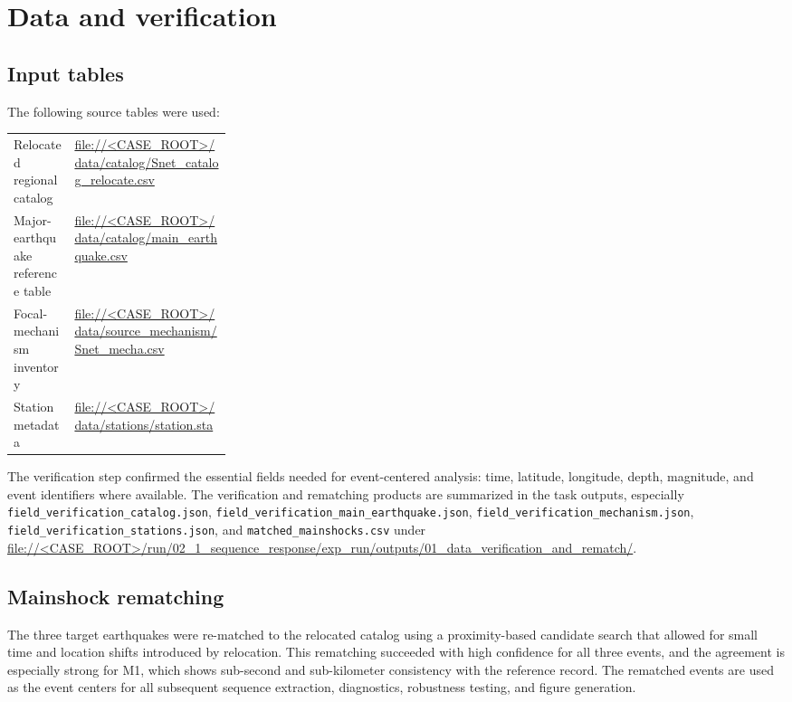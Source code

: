 \documentclass[11pt]{article}
\begin{document}
\section{Data and verification}
\subsection{Input tables}
The following source tables were used:\newline
\begin{tabularx}{\linewidth}{@{}>{\raggedright\arraybackslash}p{0.28\linewidth}X@{}}
Relocated regional catalog & \url{file://<CASE_ROOT>/data/catalog/Snet_catalog_relocate.csv} \\
Major-earthquake reference table & \url{file://<CASE_ROOT>/data/catalog/main_earthquake.csv} \\
Focal-mechanism inventory & \url{file://<CASE_ROOT>/data/source_mechanism/Snet_mecha.csv} \\
Station metadata & \url{file://<CASE_ROOT>/data/stations/station.sta} \\
\end{tabularx}

The verification step confirmed the essential fields needed for event-centered analysis: time, latitude, longitude, depth, magnitude, and event identifiers where available. The verification and rematching products are summarized in the task outputs, especially \texttt{field\_verification\_catalog.json}, \texttt{field\_verification\_main\_earthquake.json}, \texttt{field\_verification\_mechanism.json}, \texttt{field\_verification\_stations.json}, and \texttt{matched\_mainshocks.csv} under \url{file://<CASE_ROOT>/run/02_1_sequence_response/exp_run/outputs/01_data_verification_and_rematch/}.

\subsection{Mainshock rematching}
The three target earthquakes were re-matched to the relocated catalog using a proximity-based candidate search that allowed for small time and location shifts introduced by relocation. This rematching succeeded with high confidence for all three events, and the agreement is especially strong for M1, which shows sub-second and sub-kilometer consistency with the reference record. The rematched events are used as the event centers for all subsequent sequence extraction, diagnostics, robustness testing, and figure generation.
\end{document}
